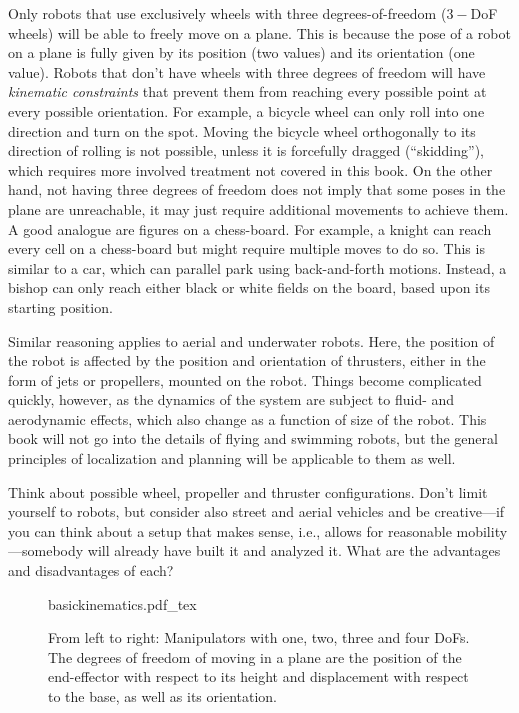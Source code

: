 Only robots that use exclusively wheels with three degrees-of-freedom ($3-$DoF wheels) will be able to freely move on a plane. This is because the pose of a robot on a plane is fully given by its position (two values) and its orientation (one value). Robots that don't have wheels with three degrees of freedom will have \textsl{kinematic constraints} that prevent them from reaching every possible point at every possible orientation. For example, a bicycle wheel can only roll into one direction and turn on the spot. Moving the bicycle wheel orthogonally to its direction of rolling is not possible, unless it is forcefully dragged (``skidding''), which requires more involved treatment not covered in this book. On the other hand, not having three degrees of freedom does not imply that some poses in the plane are unreachable, it may just require additional movements to achieve them.
A good analogue are figures on a chess-board. For example, a knight can reach every cell on a chess-board but might require multiple moves to do so. This is similar to a car, which can parallel park using back-and-forth motions. Instead, a bishop can only reach either black or white fields on the board, based upon its starting position.

Similar reasoning applies to aerial and underwater robots. Here, the position of the robot is affected by the position and orientation of thrusters, either in the form of jets or propellers, mounted on the robot. Things become complicated quickly, however, as the dynamics of the system are subject to fluid- and aerodynamic effects, which also change as a function of size of the robot. This book will not go into the details of flying and swimming robots, but the general principles of localization and planning will be applicable to them as well.

\begin{mdframed}Think about possible wheel, propeller and thruster configurations. Don't limit yourself to robots, but consider also street and aerial vehicles and be creative---if you can think about a setup that makes sense, i.e., allows for reasonable mobility---somebody will already have built it and analyzed it. What are the advantages and disadvantages of each?
\end{mdframed}

\begin{figure}[!htb]
    \centering
    \def\svgwidth{\textwidth}
    {basickinematics.pdf_tex}
    \caption{From left to right: Manipulators with one, two, three and four DoFs. The degrees of freedom of moving in a plane are the position of the end-effector with respect to its height and displacement with respect to the base, as well as its orientation.}
    \label{fig:basickinematics}
\end{figure}

